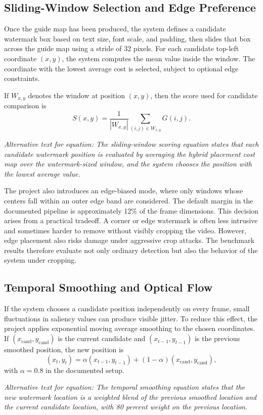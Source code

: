 \documentclass[12pt,oneside]{report}
\newcommand{\FormulaAlt}[1]{\par\small\textit{Alternative text for equation: #1}\normalsize}
\begin{document}
\subsection{Sliding-Window Selection and Edge Preference}
Once the guide map has been produced, the system defines a candidate watermark box based on text size, font scale, and padding, then slides that box across the guide map using a stride of 32 pixels. For each candidate top-left coordinate $(x,y)$, the system computes the mean value inside the window. The coordinate with the lowest average cost is selected, subject to optional edge constraints.

If $W_{x,y}$ denotes the window at position $(x,y)$, then the score used for candidate comparison is
\begin{equation}
S(x,y) = \frac{1}{|W_{x,y}|}\sum_{(i,j)\in W_{x,y}} G(i,j).
\end{equation}
\FormulaAlt{The sliding-window scoring equation states that each candidate watermark position is evaluated by averaging the hybrid placement cost map over the watermark-sized window, and the system chooses the position with the lowest average value.}

The project also introduces an edge-biased mode, where only windows whose centers fall within an outer edge band are considered. The default margin in the documented pipeline is approximately 12\% of the frame dimensions. This decision arises from a practical tradeoff. A corner or edge watermark is often less intrusive and sometimes harder to remove without visibly cropping the video. However, edge placement also risks damage under aggressive crop attacks. The benchmark results therefore evaluate not only ordinary detection but also the behavior of the system under cropping.

\subsection{Temporal Smoothing and Optical Flow}
If the system chooses a candidate position independently on every frame, small fluctuations in saliency values can produce visible jitter. To reduce this effect, the project applies exponential moving average smoothing to the chosen coordinates. If $(x_{\mathrm{cand}}, y_{\mathrm{cand}})$ is the current candidate and $(x_{t-1}, y_{t-1})$ is the previous smoothed position, the new position is
\begin{equation}
(x_t, y_t) = \alpha (x_{t-1}, y_{t-1}) + (1-\alpha)(x_{\mathrm{cand}}, y_{\mathrm{cand}}),
\end{equation}
with $\alpha = 0.8$ in the documented setup.
\FormulaAlt{The temporal smoothing equation states that the new watermark location is a weighted blend of the previous smoothed location and the current candidate location, with 80 percent weight on the previous location.}
\end{document}
